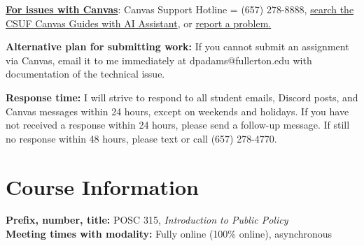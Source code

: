 \documentclass[12pt]{article}     %
\begin{document}
\vspace{0.5em}
\noindent \textbf{\underline{For issues with Canvas}}: Canvas Support Hotline = (657) 278-8888, \href{https://canvashelp.fullerton.edu/}{search the CSUF Canvas Guides with AI Assistant}, or \href{https://titans.service-now.com/sp?id=sc_cat_item&sys_id=f88efe80ebea6a10fb7cfcffcad0cdc6&subject=Canvas}{report a problem.}

\vspace{0.5em}
\noindent \textbf{Alternative plan for submitting work:} If you cannot submit an assignment via Canvas, email it to me immediately at dpadams@fullerton.edu with documentation of the technical issue.

\vspace{0.5em}
\noindent \textbf{Response time:} I will strive to respond to all student emails, Discord posts, and Canvas messages within 24 hours, except on weekends and holidays. If you have not received a response within 24 hours, please send a follow-up message. If still no response within 48 hours, please text or call (657) 278-4770.

\section*{Course Information}
\noindent \textbf{Prefix, number, title:} POSC 315, \textit{Introduction to Public Policy} \\
\noindent \textbf{Meeting times with modality:} Fully online (100\% online), asynchronous
\end{document}
